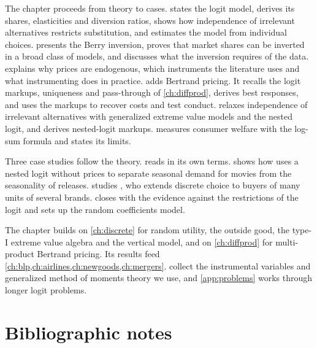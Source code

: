 The chapter proceeds from theory to cases.  states the logit model, derives its shares,
elasticities and diversion ratios, shows how independence of irrelevant alternatives restricts substitution, and
estimates the model from individual choices.  presents the Berry inversion, proves that
market shares can be inverted in a broad class of models, and discusses what the inversion requires of the data.
 explains why prices are endogenous, which instruments the literature uses and what
instrumenting does in practice.  adds Bertrand pricing. It recalls the logit markups, uniqueness
and pass-through of \cref{ch:diffprod}, derives best responses, and uses the markups to recover costs and test
conduct.  relaxes independence of irrelevant alternatives with generalized extreme value models
and the nested logit, and derives nested-logit markups.  measures consumer welfare with the log-sum formula and states its limits.

Three case studies follow the theory.  reads \citet{Berry1994} in its own terms.
 shows how \citet{Einav2007} uses a nested logit without prices to separate seasonal demand for
movies from the seasonality of releases.  studies \citet{Hendel1999}, who extends discrete
choice to buyers of many units of several brands.  closes with the evidence against the
restrictions of the logit and sets up the random coefficients model.

The chapter builds on \cref{ch:discrete} for random utility, the outside good, the type-I extreme value algebra and
the vertical model, and on \cref{ch:diffprod} for multi-product Bertrand pricing. Its results feed
\cref{ch:blp,ch:airlines,ch:newgoods,ch:mergers}.  collect the instrumental variables and
generalized method of moments theory we use, and \cref{app:problems} works through longer logit problems.






\section{Bibliographic notes}\label{sec:07-bibnotes}


